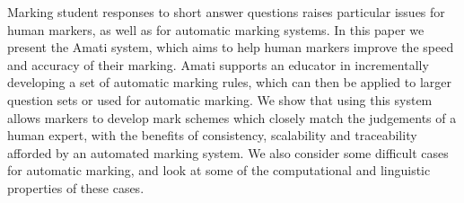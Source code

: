 Marking student responses to short answer questions raises particular issues for human markers, as well as for automatic marking systems. In this paper we present the Amati system, which aims to help human markers improve the speed and accuracy of their marking. Amati supports an educator in incrementally developing a set of automatic marking rules, which can then be applied to larger question sets or used for automatic marking. We show that using this system allows markers to develop mark schemes which closely match the judgements of a human expert, with the benefits of consistency, scalability and traceability afforded by an automated marking system. We also consider some difficult cases for automatic marking, and look at some of the computational and linguistic properties of these cases.
